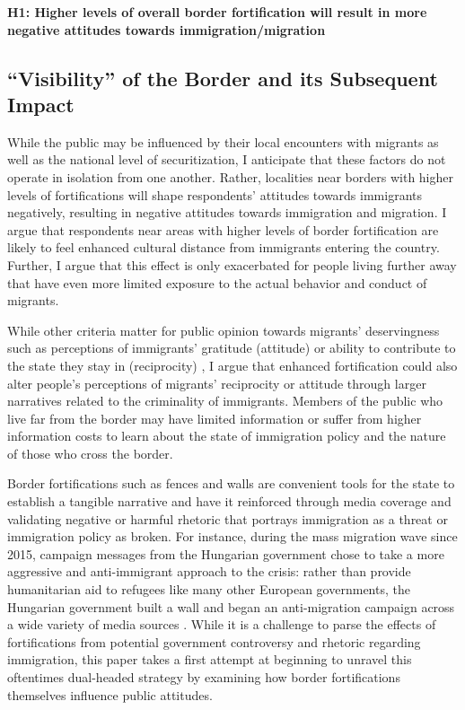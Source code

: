 \documentclass[12pt,]{article}
\begin{document}
\textbf{H1: Higher levels of overall border fortification will result in
more negative attitudes towards immigration/migration}

\subsection{``Visibility'' of the Border and its Subsequent
Impact}\label{visibility-of-the-border-and-its-subsequent-impact}

While the public may be influenced by their local encounters with
migrants as well as the national level of securitization, I anticipate
that these factors do not operate in isolation from one another. Rather,
localities near borders with higher levels of fortifications will shape
respondents' attitudes towards immigrants negatively, resulting in
negative attitudes towards immigration and migration. I argue that
respondents near areas with higher levels of border fortification are
likely to feel enhanced cultural distance from immigrants entering the
country. Further, I argue that this effect is only exacerbated for
people living further away that have even more limited exposure to the
actual behavior and conduct of migrants.

While other criteria matter for public opinion towards migrants'
deservingness such as perceptions of immigrants' gratitude (attitude) or
ability to contribute to the state they stay in (reciprocity)
\citep{deconinck2020a}, I argue that enhanced fortification could also
alter people's perceptions of migrants' reciprocity or attitude through
larger narratives related to the criminality of immigrants. Members of
the public who live far from the border may have limited information or
suffer from higher information costs to learn about the state of
immigration policy and the nature of those who cross the border.

Border fortifications such as fences and walls are convenient tools for
the state to establish a tangible narrative and have it reinforced
through media coverage and validating negative or harmful rhetoric that
portrays immigration as a threat or immigration policy as broken. For
instance, during the mass migration wave since 2015, campaign messages
from the Hungarian government chose to take a more aggressive and
anti-immigrant approach to the crisis: rather than provide humanitarian
aid to refugees like many other European governments, the Hungarian
government built a wall and began an anti-migration campaign across a
wide variety of media sources \citep{bajomi-lazar2019}. While it is a
challenge to parse the effects of fortifications from potential
government controversy and rhetoric regarding immigration, this paper
takes a first attempt at beginning to unravel this oftentimes
dual-headed strategy by examining how border fortifications themselves
influence public attitudes.
\end{document}
